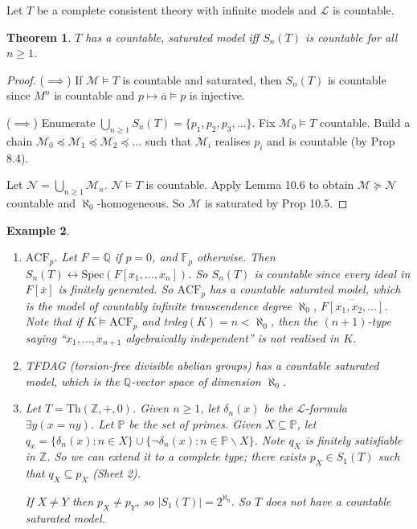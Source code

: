 \documentclass[]{article}
\theoremstyle{custhm}
\newtheorem{theorem}{Theorem}[section]
\theoremstyle{cusdef}
\theoremstyle{custhm}
\theoremstyle{custhm}
\theoremstyle{custhm}
\theoremstyle{ex}
\newtheorem{ex}[theorem]{Example}
\theoremstyle{custhm}
\theoremstyle{cusdef}
\theoremstyle{remark}
\theoremstyle{remark}
\newcommand{\Z}{\mathbb{Z}}
\newcommand{\Q}{\mathbb{Q}}
\renewcommand{\L}{\mathcal{L}}
\newcommand{\M}{\mathcal{M}}
\renewcommand{\bar}{\overline}
\newcommand{\Th}{\textrm{Th}}
\newcommand{\N}{\mathcal{N}}
\newcommand{\acf}{\textrm{ACF}}
\newcommand{\F}{\mathbb{F}}
\renewcommand{\subset}{\subseteq}
\begin{document}
Let $T$ be a complete consistent theory with infinite models and $\L$ is countable.

\begin{theorem}
$T$ has a countable, saturated model iff $S_n(T)$ is countable for all $n\ge1$.
\end{theorem}
\begin{proof}
($\implies$) If $\M\models T$ is countable and saturated, then $S_n(T)$ is countable since $M^n$ is countable and $p\mapsto \bar{a}\models p$ is injective.

($\implies$) Enumerate $\bigcup_{n\ge 1}S_n(T) = \{p_1,p_2,p_3,\dots\}$. Fix $\M_0\models T$ countable. Build a chain $\M_0\preceq\M_1\preceq\M_2\preceq\dots$ such that $\M_i$ realises $p_i$ and is countable (by Prop 8.4).

Let $\N = \bigcup_{n\ge 1}\M_n$. $\N\models T$ is countable. Apply Lemma 10.6 to obtain $\M\succeq \N$ countable and $\aleph_0$-homogeneous. So $\M$ is saturated by Prop 10.5.
\end{proof}

\begin{ex}\ 
\begin{enumerate}[label=(\arabic*)]
	\item $\acf_p$. Let $F = \Q$ if $p = 0$, and $\F_p$ otherwise. Then $S_n(T)\leftrightarrow \textrm{Spec}(F[x_1,\dots,x_n])$. So $S_n(T)$ is countable since every ideal in $F[\bar{x}]$ is finitely generated. So $\acf_p$ has a countable saturated model, which is the model of countably infinite transcendence degree $\aleph_0$, $\overline{F[x_1,x_2,\dots]}$. Note that if $K\models \acf_p$ and trdeg$(K) = n < \aleph_0$, then the $(n+1)$-type saying ``$x_1,\dots,x_{n+1}$ algebraically independent'' is not realised in $K$.
	
	\item TFDAG (torsion-free divisible abelian groups) has a countable saturated model, which is the $\Q$-vector space of dimension $\aleph_0$.
	
	\item Let $T = \Th(\Z,+,0)$. Given $n\ge 1$, let $\delta_n(x)$ be the $\L$-formula $\exists y(x = ny)$. Let $\mathbb{P}$ be the set of primes. Given $X\subset \mathbb{P}$, let $q_x = \{\delta_n(x):n\in X\}\cup\{\neg\delta_n(x):n\in \mathbb{P}\backslash X\}$. Note $q_X$ is finitely satisfiable in $\Z$. So we can extend it to a complete type; there exists $p_X \in S_1(T)$ such that $q_X \subset p_X$ (Sheet 2).
	
	If $X \ne Y$ then $p_X \ne p_Y$, so $|S_1(T)| = 2^{\aleph_0}$. So $T$ does not have a countable saturated model.
\end{enumerate}
\end{ex}
\end{document}
